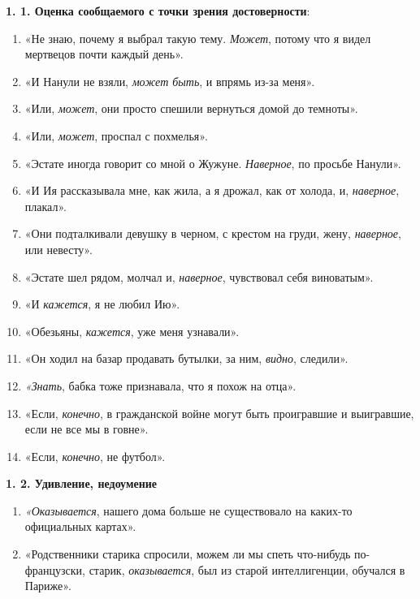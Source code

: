 \documentclass{kursa4}
\begin{document}
{      {\par}

      \textbf{1. 1. Оценка сообщаемого с точки зрения достоверности}: \begin{enumerate}
        \item «Не знаю, почему я выбрал такую тему. \textit{Может}, потому что я видел мертвецов почти каждый день». \item «И Нанули не взяли, \textit{может быть}, и впрямь из-за меня». \item «Или, \textit{может}, они просто спешили вернуться домой до темноты». \item «Или, \textit{может}, проспал с похмелья». \item «Эстате иногда говорит со мной о Жужуне. \textit{Наверное}, по просьбе Нанули». 
        \item «И Ия рассказывала мне, как жила, а я дрожал, как от холода, и, \textit{наверное}, плакал». \item «Они подталкивали девушку в черном, с крестом на груди, жену, \textit{наверное}, или невесту». 
        \item «Эстате шел рядом, молчал и, \textit{наверное}, чувствовал себя виноватым». \item «И \textit{кажется}, я не любил Ию». \item «Обезьяны, \textit{кажется}, уже меня узнавали». \item «Он ходил на базар продавать бутылки, за ним, \textit{видно}, следили». \item \textit{«Знать}, бабка тоже признавала, что я похож на отца». \item «Если, \textit{конечно}, в гражданской войне могут быть проигравшие и выигравшие, если не все мы в говне». \item «Если, \textit{конечно}, не футбол». \end{enumerate}

      \textbf{1. 2. Удивление, недоумение}
        \setcounter{saveenum}{\value{enumi}}
        \begin{enumerate}
        \setcounter{enumi}{\value{saveenum}}
        \item \textit{«Оказывается}, нашего дома больше не существовало на каких-то официальных картах». \item «Родственники старика спросили, можем ли мы спеть что-нибудь по-французски, старик, \textit{оказывается}, был из старой интеллигенции, обучался в Париже». \end{enumerate}

}
\end{document}
